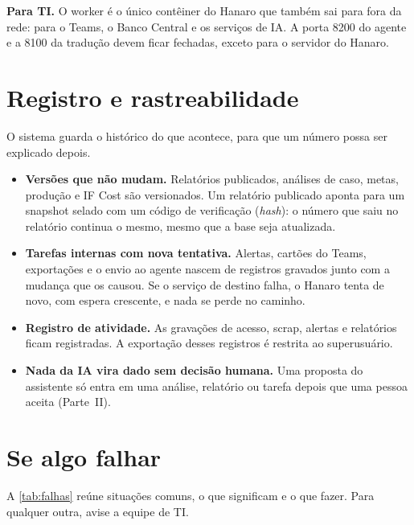 \begin{remark}[info]
\textbf{Para TI.} O worker é o único contêiner do Hanaro que também sai para fora da
rede: para o Teams, o Banco Central e os serviços de IA. A porta 8200 do agente e a
8100 da tradução devem ficar fechadas, exceto para o servidor do Hanaro.
\end{remark}

\section{Registro e rastreabilidade}

O sistema guarda o histórico do que acontece, para que um número possa ser explicado
depois.

\begin{itemize}
    \item \textbf{Versões que não mudam.} Relatórios publicados, análises de caso,
          metas, produção e IF Cost são versionados. Um relatório publicado aponta
          para um snapshot selado com um código de verificação (\emph{hash}): o número
          que saiu no relatório continua o mesmo, mesmo que a base seja atualizada.
    \item \textbf{Tarefas internas com nova tentativa.} Alertas, cartões do Teams,
          exportações e o envio ao agente nascem de registros gravados junto com a
          mudança que os causou. Se o serviço de destino falha, o Hanaro tenta de novo,
          com espera crescente, e nada se perde no caminho.
    \item \textbf{Registro de atividade.} As gravações de acesso, scrap, alertas e
          relatórios ficam registradas. A exportação desses registros é restrita ao
          superusuário.
    \item \textbf{Nada da IA vira dado sem decisão humana.} Uma proposta do assistente
          só entra em uma análise, relatório ou tarefa depois que uma pessoa aceita
          (Parte~II).
\end{itemize}

\section{Se algo falhar}

A \autoref{tab:falhas} reúne situações comuns, o que significam e o que fazer. Para
qualquer outra, avise a equipe de TI.

